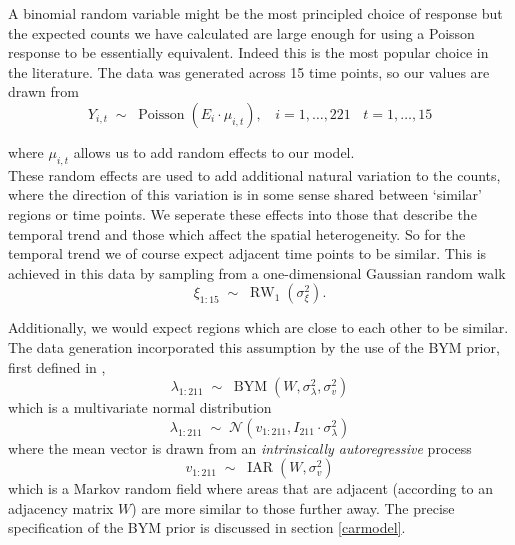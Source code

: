 \documentclass[11pt]{report}
\begin{document}
A binomial random variable might be the most principled choice of response but the expected counts we have calculated are large enough for using a Poisson response to be essentially equivalent. Indeed this is the most popular choice in the literature. The data was generated across 15 time points, so our values are drawn from
\begin{equation}
Y_{i,t} \; \sim \; \operatorname{Poisson}(E_i \cdot \mu_{i,t}), \ \ \ \ i=1,\ldots,221 \ \ \ \ t=1,\ldots,15
\end{equation} 

where $\mu_{i,t}$ allows us to add random effects to our model. \\

These random effects are used to add additional natural variation to the counts, where the direction of this variation is in some sense shared between `similar' regions or time points. We seperate these effects into those that describe the temporal trend and those which affect the spatial heterogeneity. So for the temporal trend we of course expect adjacent time points to be similar. This is achieved in this data by sampling from a one-dimensional Gaussian random walk
\begin{equation}
\xi_{1:15} \; \sim \; \operatorname{RW}_1(\sigma_{\xi}^2).
\end{equation}

Additionally, we would expect regions which are close to each other to be similar. The data generation incorporated this assumption by the use of the BYM prior, first defined in \citet{bym},
\begin{equation}
\lambda_{1:211} \; \sim \; \operatorname{BYM}(W, \sigma_{\lambda}^2, \sigma_v^2) 
\end{equation}
which is a multivariate normal distribution
\begin{equation}
\lambda_{1:211} \; \sim \; \mathcal{N}(v_{1:211}, I_{211} \cdot\sigma_{\lambda}^2)
\end{equation} 
where the mean vector is drawn from an \emph{intrinsically autoregressive} process
\begin{equation}
v_{1:211} \; \sim \; \operatorname{IAR}(W, \sigma_v^2)
\end{equation}
which is a Markov random field where areas that are adjacent (according to an adjacency matrix $W$) are more similar to those further away. The precise specification of the BYM prior is discussed in section \ref{carmodel}. \\
\end{document}

